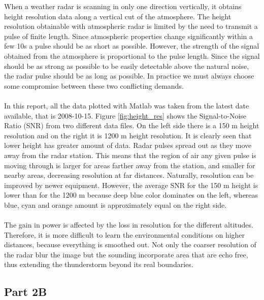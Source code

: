 \documentclass{article}
\begin{document}
When a weather radar is scanning in only one direction vertically, it obtains height resolution data along a vertical cut of the atmosphere.\cite{Wiki:2012wr} The height resolution obtainable with atmospheric radar is limited by the need to transmit a pulse of finite length. Since atmospheric properties change significantly within a few 10s a pulse should be as short as possible. However, the strength of the signal obtained from the atmosphere is proportional to the pulse length. Since the signal should be as strong as possible to be easily detectable above the natural noise, the radar pulse should be as long as possible. In practice we must always choose some compromise between these two conflicting demands. \cite{Enmark:2012a2}\\
\\
In this report, all the data plotted with Matlab was taken from the latest date available, that is 2008-10-15. Figure \ref{fig:height_res} shows the Signal-to-Noise Ratio (SNR) from two different data files. On the left side there is a 150 m height resolution and on the right it is 1200 m height resolution. It is clearly seen that lower height has greater amount of data. Radar pulses spread out as they move away from the radar station. This means that the region of air any given pulse is moving through is larger for areas farther away from the station, and smaller for nearby areas, decreasing resolution at far distances. Naturally, resolution can be improved by newer equipment.\cite{Wiki:2012wr} However, the average SNR for the 150 m height is lower than for the 1200 m because deep blue color dominates on the left, whereas blue, cyan and orange amount is approximately equal on the right side.\\
\\
The gain in power is affected by the loss in resolution for the different altitudes. Therefore, it is more difficult to learn the environmental conditions on higher distances, because everything is smoothed out. Not only the coarser resolution of the radar blur the image but the sounding incorporate area that are echo free, thus extending the thunderstorm beyond its real boundaries.\cite{Wiki:2012wr}



\subsection{Part 2B}
\end{document}

